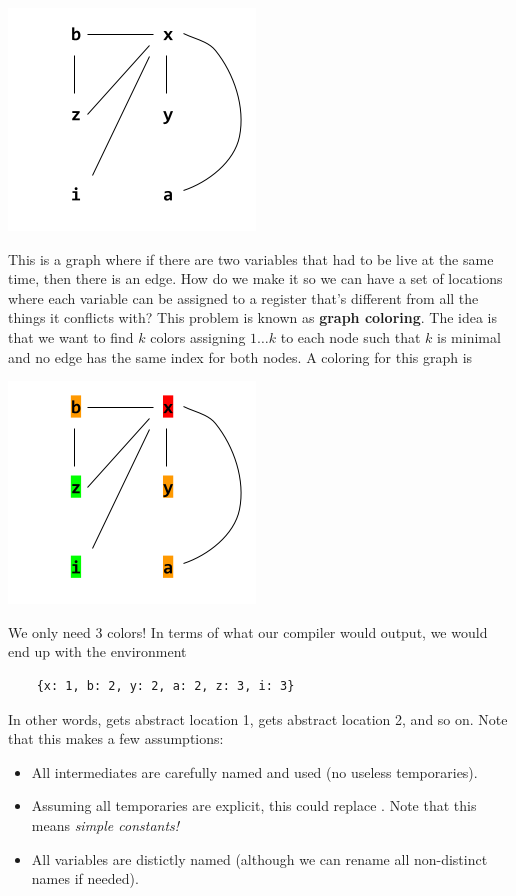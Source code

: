 \documentclass[letterpaper]{article}
\begin{document}
\begin{center}
    \includegraphics[scale=0.6]{../assets/loc_use1.png}
\end{center}
This is a graph where if there are two variables that had to be live at the same time, then there is an edge. How do we make it so we can have a set of locations where each variable can be assigned to a register that's different from all the things it conflicts with? This problem is known as \textbf{graph coloring}. The idea is that we want to find $k$ colors assigning $1 \hdots k$ to each node such that $k$ is minimal and no edge has the same index for both nodes. A coloring for this graph is 
\begin{center}
    \includegraphics[scale=0.6]{../assets/loc_use2.png}
\end{center}
We only need 3 colors! In terms of what our compiler would output, we would end up with the environment 
\begin{verbatim}
    {x: 1, b: 2, y: 2, a: 2, z: 3, i: 3}\end{verbatim}
In other words,  gets abstract location 1,  gets abstract location 2, and so on. Note that this makes a few assumptions: 
\begin{itemize}
    \item All intermediates are carefully named and used (no useless temporaries).
    \item Assuming all temporaries are explicit, this could replace . Note that this means \emph{simple constants!}
    \item All variables are distictly named (although we can rename all non-distinct names if needed).
\end{itemize}
\end{document}

